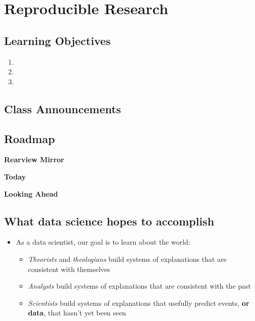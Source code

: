 \documentclass[
  letterpaper,
  DIV=11,
  numbers=noendperiod]{scrreprt}
\providecommand{\tightlist}{%
  \setlength{\itemsep}{0pt}\setlength{\parskip}{0pt}}\usepackage{longtable,booktabs,array}
\begin{document}
\chapter{Reproducible Research}\label{reproducible-research}

\section{Learning Objectives}\label{learning-objectives-12}

\begin{enumerate}
\def\labelenumi{\arabic{enumi}.}
\tightlist
\item
\item
\item
\end{enumerate}

\section{Class Announcements}\label{class-announcements-11}

\section{Roadmap}\label{roadmap-9}

\textbf{Rearview Mirror}

\textbf{Today}

\textbf{Looking Ahead}

\section{What data science hopes to
accomplish}\label{what-data-science-hopes-to-accomplish}

\begin{itemize}
\tightlist
\item
  As a data scientist, our goal is to learn about the world:

  \begin{itemize}
  \tightlist
  \item
    \emph{Theorists} and \emph{theologians} build systems of
    explanations that are consistent with themselves
  \item
    \emph{Analysts} build systems of explanations that are consistent
    with the past
  \item
    \emph{Scientists} build systems of explanations that usefully
    predict events, \textbf{or data}, that hasn't yet been seen
  \end{itemize}
\end{itemize}
\end{document}
